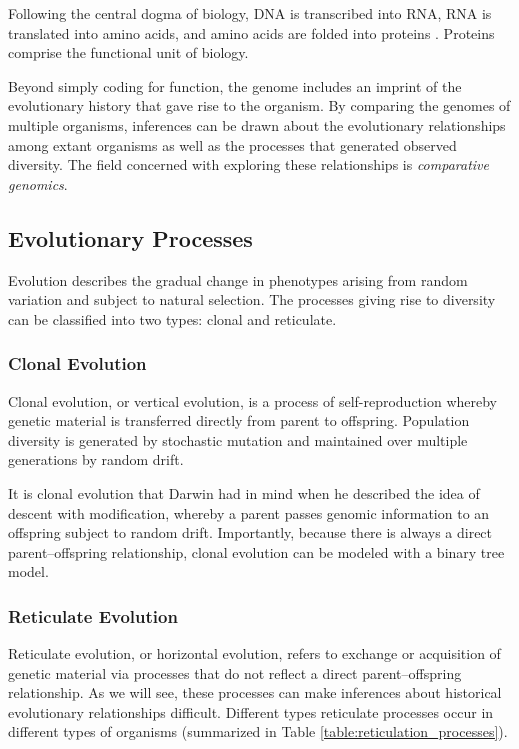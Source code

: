 Following the central dogma of biology, DNA is transcribed into RNA, RNA is translated into amino acids, and amino acids are folded into proteins \cite{Crick:1970wb}.
Proteins comprise the functional unit of biology.

Beyond simply coding for function, the genome includes an imprint of the evolutionary history that gave rise to the organism.
By comparing the genomes of multiple organisms, inferences can be drawn about the evolutionary relationships among extant organisms as well as the processes that generated observed diversity.
The field concerned with exploring these relationships is \emph{comparative genomics}.

\subsection{Evolutionary Processes}
\label{bg:bio:evolution}

Evolution describes the gradual change in phenotypes arising from random variation and subject to natural selection.
The processes giving rise to diversity can be classified into two types: clonal and reticulate.

\subsubsection{Clonal Evolution}
\label{bg:bio:evolution:clonal}

Clonal evolution, or vertical evolution, is a process of self-reproduction whereby genetic material is transferred directly from parent to offspring.
Population diversity is generated by stochastic mutation and maintained over multiple generations by random drift.

It is clonal evolution that Darwin had in mind when he described the idea of descent with modification, whereby a parent passes genomic information to an offspring subject to random drift.
Importantly, because there is always a direct parent--offspring relationship, clonal evolution can be modeled with a binary tree model.

\subsubsection{Reticulate Evolution}
\label{bg:bio:evolution:reticulate}

Reticulate evolution, or horizontal evolution, refers to exchange or acquisition of genetic material via processes that do not reflect a direct parent--offspring relationship.
As we will see, these processes can make inferences about historical evolutionary relationships difficult.
Different types reticulate processes occur in different types of organisms (summarized in Table \ref{table:reticulation_processes}).

